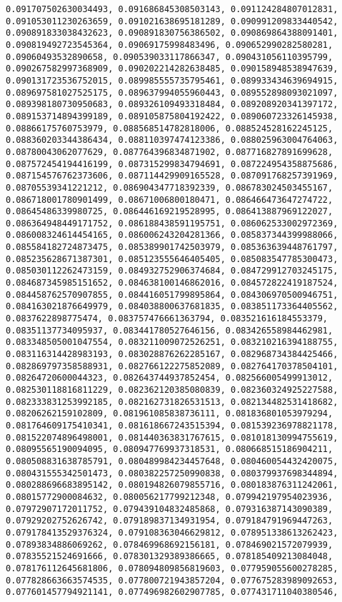 \documentclass[11pt]{article}
\begin{document}
\begin{Verbatim}[commandchars=\\\{\}]
0.091707502630034493, 0.091686845308503143, 0.091124284807012831, 0.091053011230263659, 0.091021638695181289, 0.090991209833440542, 0.090891833038432623, 0.090891830756386502, 0.090869864388091401, 0.090819492723545364, 0.09069175998483496, 0.090652990282580281, 0.09060493532890658, 0.090539033117866347, 0.090431056110395799, 0.090267582997368909, 0.090202214282638485, 0.090158948538947639, 0.090131723536752015, 0.089985555735795461, 0.089933434639694915, 0.089697581027525175, 0.089637994055960443, 0.089552898093021097, 0.089398180730950683, 0.089326109493318484, 0.089208920341397172, 0.089153714894399189, 0.089105875804192422, 0.089060723326145938, 0.08866175760753979, 0.088568514782818006, 0.088524528162245125, 0.088360203344386434, 0.088110397474123386, 0.088025963004764063, 0.08780043062077629, 0.087764396834871902, 0.087716827891699628, 0.087572454194416199, 0.087315299834794691, 0.087224954358875686, 0.087154576762373606, 0.087114429909165528, 0.087091768257391969, 0.08705539341221212, 0.086904347718392339, 0.086783024503455167, 0.086718001780901499, 0.08671006800180471, 0.086466473647274722, 0.08645486339980725, 0.086446169219528995, 0.086413887969122027, 0.086364948449171752, 0.086188438591195751, 0.086062533002972369, 0.086008324614454165, 0.086006243204281366, 0.085837344399988066, 0.085584182724873475, 0.085389901742503979, 0.085363639448761797, 0.085235628671387301, 0.085123555646405405, 0.085083547785300473, 0.085030112262473159, 0.084932752906374684, 0.084729912703245175, 0.084687345985151652, 0.084638100146862016, 0.084572822419187524, 0.084458762570907855, 0.084416051799895864, 0.084306970500946751, 0.084163021876649979, 0.084038800637681835, 0.083851173364405562, 0.0837622898775474, 0.083757476661363794, 0.083521616184553379, 0.08351137734095937, 0.083441780527646156, 0.083426558984462981, 0.083348505001047554, 0.083211009072526251, 0.083210216394188755, 0.083116314428983193, 0.083028876262285167, 0.082968734384425466, 0.082869797358588931, 0.082766122275852089, 0.082764170378504101, 0.08264720600044323, 0.082643744937852454, 0.082566005499913012, 0.082530118816811229, 0.082362120385080839, 0.082360324925227588, 0.082333831253992185, 0.082162731826531513, 0.082134482531418682, 0.08206262159102809, 0.081961085838736111, 0.081836801053979294, 0.081764609175410341, 0.081618667243515394, 0.081539236978821178, 0.081522074896498001, 0.081440363831767615, 0.081018130994755619, 0.08095565190094095, 0.080947769937318531, 0.080668515186904211, 0.080508831638785791, 0.080489984234457648, 0.080460054432420075, 0.080431555342501473, 0.080382257250990838, 0.080379937698344894, 0.080288696683895142, 0.080194826079855716, 0.080183876311242061, 0.08015772900084632, 0.080056217799212348, 0.079942197954023936, 0.07972907172011752, 0.079439104832485868, 0.079316387143090389, 0.07929202752626742, 0.079189837134931954, 0.079184791969447263, 0.079178413529376324, 0.079108363046629812, 0.078951338613262423, 0.07893834886069262, 0.078469968692156181, 0.078469021572079939, 0.07835521524691666, 0.078301329389386665, 0.078185409213084048, 0.078176112645681806, 0.078094809856819603, 0.077959055600278285, 0.077828663663574535, 0.077800721943857204, 0.077675283989092653, 0.077601457794921141, 0.077496982602907785, 0.077431711040380546, 
\end{Verbatim}
\end{document}
